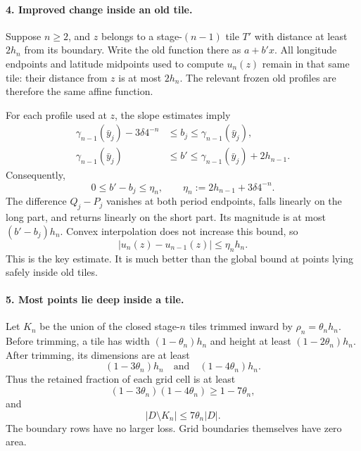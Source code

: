 \documentclass[11pt,letterpaper]{article}
\numberwithin{equation}{section}
\theoremstyle{remark}
\begin{document}
\paragraph{4. Improved change inside an old tile.}
Suppose $n\ge2$, and $z$ belongs to a stage-$(n-1)$ tile $T'$ with distance at least $2h_n$ from its boundary. Write the old function there as $a+b'x$. All longitude endpoints and latitude midpoints used to compute $u_n(z)$ remain in that same tile: their distance from $z$ is at most $2h_n$. The relevant frozen old profiles are therefore the same affine function.

For each profile used at $z$, the slope estimates imply
\begin{align*}
 \gamma_{n-1}(\bar y_j)-3\delta4^{-n}
 &\le b_j\le\gamma_{n-1}(\bar y_j),\\
 \gamma_{n-1}(\bar y_j)
 &\le b'\le\gamma_{n-1}(\bar y_j)+2h_{n-1}.
\end{align*}
Consequently,
\begin{equation}\label{eq:eta}
 0\le b'-b_j\le\eta_n,
 \qquad\eta_n:=2h_{n-1}+3\delta4^{-n}.
\end{equation}
The difference $Q_j-P_j$ vanishes at both period endpoints, falls linearly on the long part, and returns linearly on the short part. Its magnitude is at most $(b'-b_j)h_n$. Convex interpolation does not increase this bound, so
\begin{equation}\label{eq:localstage}
 |u_n(z)-u_{n-1}(z)|\le\eta_nh_n.
\end{equation}
This is the key estimate. It is much better than the global bound at points lying safely inside old tiles.

\paragraph{5. Most points lie deep inside a tile.}
Let $K_n$ be the union of the closed stage-$n$ tiles trimmed inward by $\rho_n=\theta_nh_n$. Before trimming, a tile has width $(1-\theta_n)h_n$ and height at least $(1-2\theta_n)h_n$. After trimming, its dimensions are at least
\[
 (1-3\theta_n)h_n\quad\text{and}\quad(1-4\theta_n)h_n.
\]
Thus the retained fraction of each grid cell is at least
\[
 (1-3\theta_n)(1-4\theta_n)\ge1-7\theta_n,
\]
and
\begin{equation}\label{eq:badmeasure}
 |D\setminus K_n|\le7\theta_n|D|.
\end{equation}
The boundary rows have no larger loss. Grid boundaries themselves have zero area.
\end{document}
